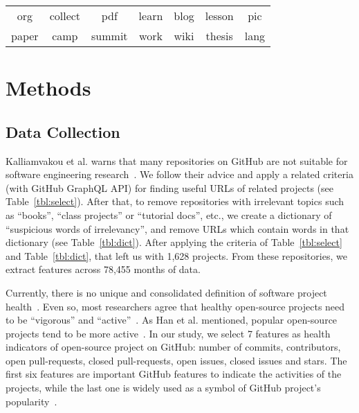 \documentclass[sigconf,review,anonymous]{acmart}
\begin{document}
\begin{table}[!b]
\begin{adjustbox}{max width=0.48\textwidth}
\begin{tabular}{ccccccc}
\rowcolor[HTML]{F3F3F3} 
{\color[HTML]{000000} org} & {\color[HTML]{000000} collect} & {\color[HTML]{000000} pdf} & {\color[HTML]{000000} learn} & {\color[HTML]{000000} blog} & {\color[HTML]{000000} lesson} & {\color[HTML]{000000} pic} \\
\rowcolor[HTML]{FFFFFF} 
{\color[HTML]{000000} paper} & {\color[HTML]{000000} camp} & {\color[HTML]{000000} summit} & {\color[HTML]{000000} work} & {\color[HTML]{000000} wiki} & {\color[HTML]{000000} thesis} & {\color[HTML]{000000} lang}
\end{tabular}
\end{adjustbox}
\end{table}
  




\section{Methods}
\label{sect:empir} 
\subsection{Data Collection}
\label{sect:data_collect}

Kalliamvakou et al. warns that  many repositories on GitHub are not suitable for   software engineering research~\cite{kalliamvakou2016depth}. We follow their advice and apply a related criteria (with GitHub GraphQL API) for finding useful URLs of related projects (see Table~\ref{tbl:select}).
After that, to remove repositories with irrelevant topics such as ``books'', ``class projects'' or ``tutorial docs'', etc., we create a dictionary of ``suspicious words of irrelevancy'', and remove URLs which contain words in that dictionary (see  Table~\ref{tbl:dict}). After applying the criteria of Table~\ref{tbl:select} and Table~\ref{tbl:dict}, that left us with 1,628 projects. From these repositories, we extract features across 78,455 months of data.


Currently, there is no unique and consolidated definition of software project health~\cite{jansen2014measuring,liao2019healthy,link2018assessing}.
Even so,  most researchers agree that healthy open-source projects need to be ``vigorous'' and ``active''~\cite{wahyudin2007monitoring,jansen2014measuring,manikas2013reviewing,link2018assessing,wynn2007assessing,crowston2006assessing}. As Han et al. mentioned, popular open-source projects tend to be more active~\cite{han2019characterization}. In our study, we select 7 features as health indicators of open-source project on GitHub: number of commits, contributors, open pull-requests, closed pull-requests, open issues, closed issues and stars. The first six features are important GitHub features to indicate the activities of the projects, while the last one is widely used as a symbol of GitHub project's popularity~\cite{borges2016understanding,han2019characterization,aggarwal2014co}.
\end{document}
